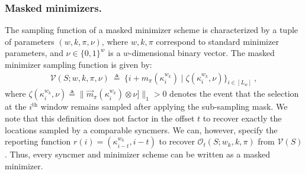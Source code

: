 \vspace{-2mm}
\subsubsection{Masked minimizers.} The sampling function of a masked minimizer scheme is characterized by a tuple of parameters $(w, k, \pi, \nu)$, where $w,k,\pi$ correspond to standard minimizer parameters, and $\nu\in\{0,1\}^w$ is a $w$-dimensional binary vector. The masked minimizer sampling function is given by:
\begin{eqnarray}
\mathcal{V}(S; w,k,\pi,\nu) \ \triangleq \ \{i + m_\pi(\kappa^{w_k}_i) \mid \zeta(\kappa^{w_k}_i, \nu)\}_{i\in[L_w]} \ ,
\end{eqnarray}
where $\zeta(\kappa^{w_k}_i, \nu) \triangleq \|\overrightarrow{m}_\pi(\kappa^{w_k}_i) \otimes \nu]\|_1 > 0$ denotes the event that the selection at the $i^{\text{th}}$ window remains sampled after applying the sub-sampling mask. We note that this definition does not factor in the offset $t$ to recover exactly the locations sampled by a comparable syncmers. We can, however, specify the reporting function $r(i)=(\kappa^{w_k}_{i-t},i-t)$ to recover $\mathcal{O}_t(S; w_k,k,\pi)$ from $\mathcal{V}(S)$. Thus, every syncmer and minimizer scheme can be written as a masked minimizer.
\vspace{-3mm}